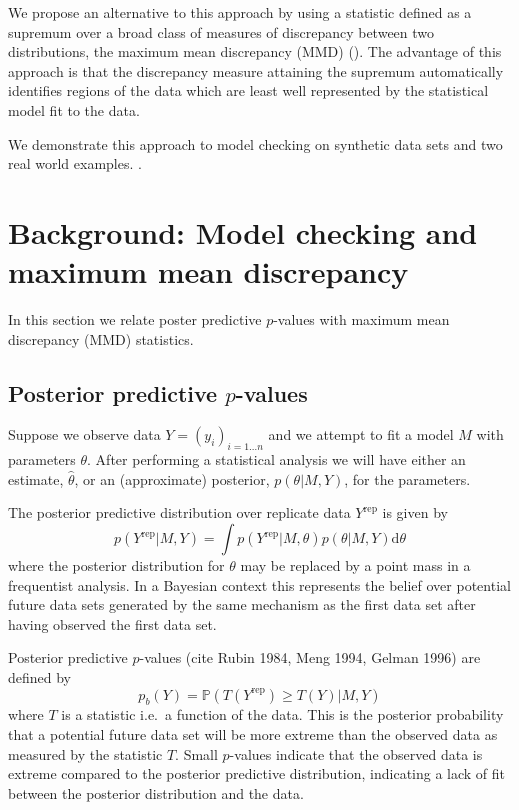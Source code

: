 \documentclass{article} %
\def\ie{i.e.\ }
\begin{document}
We propose an alternative to this approach by using a statistic defined as a supremum over a broad class of measures of discrepancy between two distributions, the maximum mean discrepancy (MMD)  ().
The advantage of this approach is that the discrepancy measure attaining the supremum automatically identifies regions of the data which are least well represented by the statistical model fit to the data.

We demonstrate this approach to model checking on synthetic data sets and two real world examples.
.

\section{Background: Model checking and maximum mean discrepancy}

In this section we relate poster predictive $p$-values with maximum mean discrepancy (MMD)  statistics.

\subsection{Posterior predictive $p$-values}

Suppose we observe data $Y = (y_i)_{i=1\ldots n}$ and we attempt to fit a model $M$ with parameters $\theta$.
After performing a statistical analysis we will have either an estimate, $\hat\theta$, or an (approximate) posterior, $p(\theta|M,Y)$, for the parameters.

The posterior predictive distribution over replicate data $Y^\textrm{rep}$ is given by
\begin{equation}
p(Y^\textrm{rep}|M,Y) = \int p(Y^\textrm{rep}|M,\theta)p(\theta|M,Y)\mathrm{d}\theta
\end{equation}
where the posterior distribution for $\theta$ may be replaced by a point mass in a frequentist analysis.
In a Bayesian context this represents the belief over potential future data sets generated by the same mechanism as the first data set after having observed the first data set.

Posterior predictive $p$-values (cite Rubin 1984, Meng 1994, Gelman 1996) are defined by
\begin{equation}
p_b(Y) = \mathbb{P}(T(Y^\textrm{rep})\geq T(Y)|M,Y)
\end{equation}
where $T$ is a statistic \ie a function of the data.
This is the posterior probability that a potential future data set will be more extreme than the observed data as measured by the statistic $T$.
Small $p$-values indicate that the observed data is extreme compared to the posterior predictive distribution, indicating a lack of fit between the posterior distribution and the data.
\end{document}
